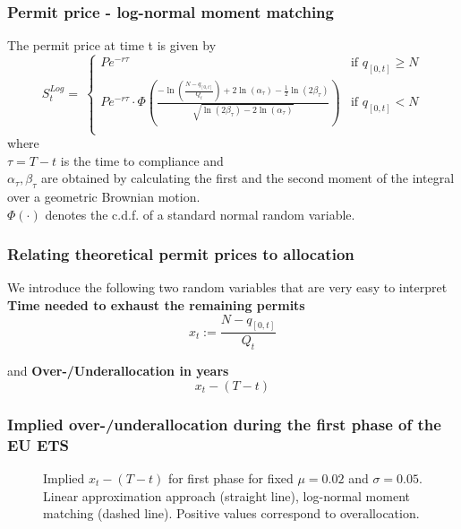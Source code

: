 \begin{frame}
  \frametitle{Permit price - log-normal moment matching}

    The permit price at time t is given by
$$
S_t^{Log} = \ \left\{
         \begin{array}{ll}
            P e^{-r\tau}
            &\mbox{if $q_{[0,t]} \ge N$} \\
            P e^{-r\tau} \cdot \Phi \left(\frac{-\ln\left( \frac{N - q_{[0,t]}}{Q_t} \right) + 2\ln(\alpha_{\tau}) - \frac{1}{2} \ln(2\beta_{\tau})}{\sqrt{\ln(2\beta_{\tau}) - 2\ln(\alpha_{\tau})}} \right) & \mbox{if $q_{[0,t]} < N$} \\
         \end{array} \right.
$$
where \\
$\tau = T - t$ is the time to compliance and \\
$\alpha_{\tau}, \beta_{\tau}$ are obtained by calculating the first and the second moment of the integral over a geometric Brownian motion. \\
$\Phi(\cdot)$ denotes the c.d.f. of a standard normal random variable.

\end{frame}


\begin{frame}
  \frametitle{Relating theoretical permit prices to allocation}
    We introduce the following two random variables that are very easy to interpret\\
    {\bf Time needed to exhaust the remaining permits}
$$
x_t := \frac{N - q_{[0,t]}}{Q_t}
$$

and
{\bf Over-/Underallocation in years}
$$
x_t - (T-t)
$$
\end{frame}



\begin{frame}
  \frametitle{Implied over-/underallocation during the first phase of the EU ETS}
\begin{center}
\begin{figure}[h!]
\centering
{}
{\tiny \caption{Implied $x_t - (T-t)$ for first phase for fixed  $\mu = 0.02$ and $\sigma = 0.05$. Linear approximation approach (straight line), log-normal moment matching (dashed line). Positive values correspond to overallocation.}}
\label{fig:plot10}
\end{figure}
\end{center}
\end{frame}


